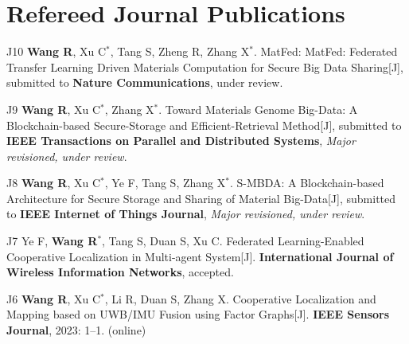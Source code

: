 
        \section{Refereed Journal Publications}
    
        
		\pub
		{J10}
		{\textbf{Wang R}, Xu C$^*$, Tang S, Zheng R, Zhang X$^*$. MatFed: MatFed: Federated Transfer Learning Driven Materials Computation for Secure Big Data Sharing[J], submitted to \textbf{Nature Communications}, under review.}
        
         \pub
        {J9}
        {\textbf{Wang R}, Xu C$^*$, Zhang X$^*$. Toward Materials Genome Big-Data: A Blockchain-based Secure-Storage and Efficient-Retrieval Method[J], submitted to \textbf{IEEE Transactions on Parallel and Distributed Systems}, \textit{Major revisioned, under review}.}
        
        
        \pub
        {J8}
       {\textbf{Wang R}, Xu C$^*$, Ye F, Tang S, Zhang X$^*$. S-MBDA: A Blockchain-based Architecture for Secure Storage and Sharing of Material Big-Data[J], submitted to \textbf{IEEE Internet of Things Journal}, \textit{Major revisioned, under review}.}
        
        \pub
		{J7}
		{Ye F, \textbf{Wang R$^*$}, Tang S, Duan S, Xu C. Federated Learning-Enabled Cooperative Localization in Multi-agent System[J]. \textbf{International Journal of Wireless Information Networks}, accepted.}


		\pub
		{J6}
		{\textbf{Wang R}, Xu C$^*$, Li R, Duan S, Zhang X. Cooperative Localization and Mapping based on UWB/IMU Fusion using Factor Graphs[J]. \textbf{IEEE Sensors Journal}, 2023: 1–1. (online)}

